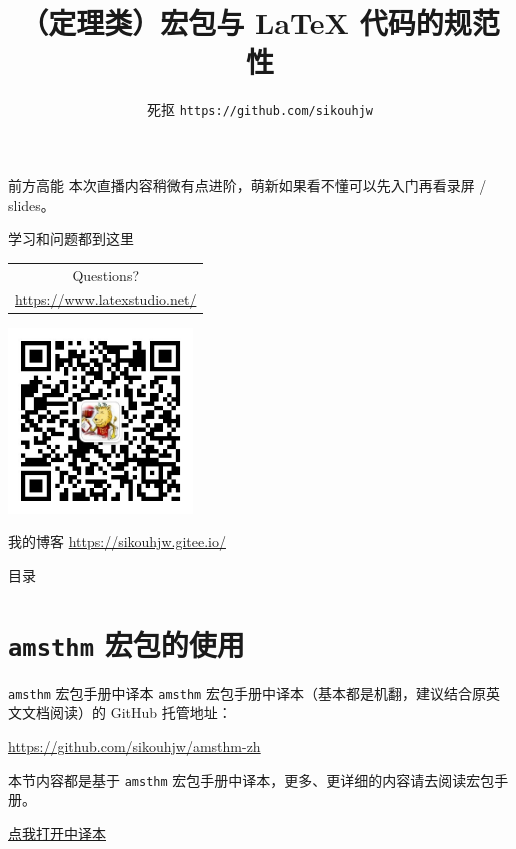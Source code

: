\documentclass[aspectratio=169,fontset=none]{ctexbeamer}
\title{\pkg{amsthm} （定理类）宏包与 \LaTeX{} 代码的规范性}
\author{死抠 \texttt{https://github.com/sikouhjw}}
\newcommand{\pkg}[1]{\texttt{#1}}
\begin{document}
  \maketitle
  \begin{frame}[standout]{前方高能}
    本次直播内容稍微有点进阶，萌新如果看不懂可以先入门再看录屏 / slides。
  \end{frame}
  \begin{frame}[standout]{学习和问题都到这里}
    \begin{tabular}{c}
      {\Huge Questions?} \\
      \url{https://www.latexstudio.net/}
    \end{tabular}

    \includegraphics[width=4.9cm]{material/latex工作室.jpg}
  \end{frame}
  \begin{frame}[standout]{我的博客}
    \url{https://sikouhjw.gitee.io/}
  \end{frame}
  \begin{frame}{目录}
    \tableofcontents
  \end{frame}
  \section{\texorpdfstring{\pkg{amsthm}}{amsthm} 宏包的使用}
  \begin{frame}{\pkg{amsthm} 宏包手册中译本}
    \pkg{amsthm} 宏包手册中译本（基本都是机翻，建议结合原英文文档阅读）的 GitHub 托管地址：
    \begin{center}
      \url{https://github.com/sikouhjw/amsthm-zh}
    \end{center}
    本节内容都是基于 \pkg{amsthm} 宏包手册中译本，更多、更详细的内容请去阅读宏包手册。
    \begin{center}
      \href{material/amsthdoc-zh-v1.0.pdf}{点我打开中译本}
    \end{center}
  \end{frame}
\end{document}
